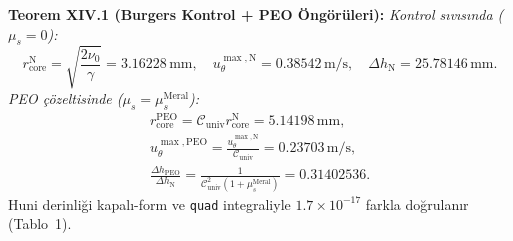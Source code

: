 \documentclass[12pt,a4paper]{article}
\begin{document}
\textbf{Teorem XIV.1 (Burgers Kontrol + PEO Öngörüleri):} \textit{Kontrol
sıvısında ($\mu_s=0$):}
\begin{equation}
\label{eq:burgers}
\boxed{r_{\mathrm{core}}^{\mathrm{N}}=\sqrt{\frac{2\nu_0}{\gamma}}
=3.16228\,\mathrm{mm},\quad
u_\theta^{\max,\mathrm{N}}=0.38542\,\mathrm{m/s},\quad
\Delta h_{\mathrm{N}}=25.78146\,\mathrm{mm}.}
\end{equation}
\textit{PEO çözeltisinde ($\mu_s=\mu_s^{\mathrm{Meral}}$):}
\begin{equation}
\label{eq:peo}
\begin{split}
\boxed{r_{\mathrm{core}}^{\mathrm{PEO}}=\mathcal{C}_{\mathrm{univ}}r_{\mathrm{core}}^{\mathrm{N}}
=5.14198\,\mathrm{mm},} \\
\boxed{u_\theta^{\max,\mathrm{PEO}}=\frac{u_\theta^{\max,\mathrm{N}}}{\mathcal{C}_{\mathrm{univ}}}
=0.23703\,\mathrm{m/s},} \\
\boxed{\frac{\Delta h_{\mathrm{PEO}}}{\Delta h_{\mathrm{N}}}
=\frac{1}{\mathcal{C}_{\mathrm{univ}}^2(1+\mu_s^{\mathrm{Meral}})}=0.31402536.}
\end{split}
\end{equation}
Huni derinliği kapalı-form ve \texttt{quad} integraliyle $1.7\times 10^{-17}$
farkla doğrulanır (Tablo~1).
\end{document}
